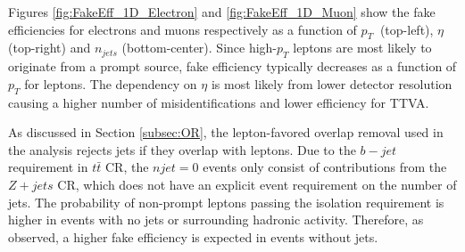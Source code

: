 Figures \ref{fig:FakeEff_1D_Electron} and \ref{fig:FakeEff_1D_Muon} show the fake efficiencies for electrons and muons respectively as a function of $p_{T}~$ (top-left), $\eta$ (top-right) and $n_{jets}$ (bottom-center). Since high-$p_{T}$ leptons are most likely to originate from a prompt source, fake efficiency typically decreases as a function of $p_{T}$ for leptons. The dependency on $\eta$ is most likely from lower detector resolution causing a higher number of misidentifications and lower efficiency for TTVA.

As discussed in Section \ref{subsec:OR}, the lepton-favored overlap removal used in the analysis rejects jets if they overlap with leptons. Due to the $b-jet$ requirement in $t\bar{t}$ CR, the $njet=0$ events only consist of contributions from the $Z+jets$ CR, which does not have an explicit event requirement on the number of jets. The probability of non-prompt leptons passing the isolation requirement is higher in events with no jets or surrounding hadronic activity. Therefore, as observed, a higher fake efficiency is expected in events without jets.  

